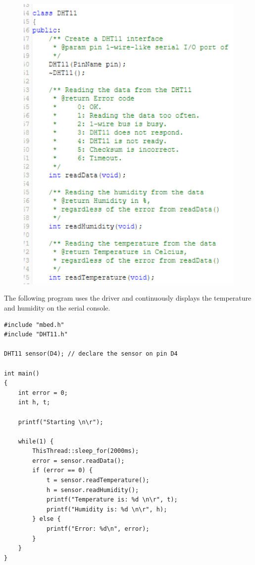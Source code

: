 \documentclass[10pt,a4paper,onecolumn]{article}
\begin{document}
\begin{figure}[H]
  \begin{center}
    \includegraphics[width=\dimexpr\textwidth-1cm\relax,height=\dimexpr0.25\textheight-1cm\relax,keepaspectratio]{images/20.png}
  \end{center}
\end{figure}

The following program uses the driver and continuously displays the temperature and humidity on the serial console.

\begin{lstlisting}[style=CStyle]
#include "mbed.h"
#include "DHT11.h"

DHT11 sensor(D4); // declare the sensor on pin D4

int main()
{
    int error = 0;
    int h, t;

    printf("Starting \n\r");

    while(1) {
        ThisThread::sleep_for(2000ms);
        error = sensor.readData();
        if (error == 0) {
            t = sensor.readTemperature();
            h = sensor.readHumidity();
            printf("Temperature is: %d \n\r", t);
            printf("Humidity is: %d \n\r", h);
        } else {
            printf("Error: %d\n", error);
        }
    }
}
\end{lstlisting}
\end{document}
